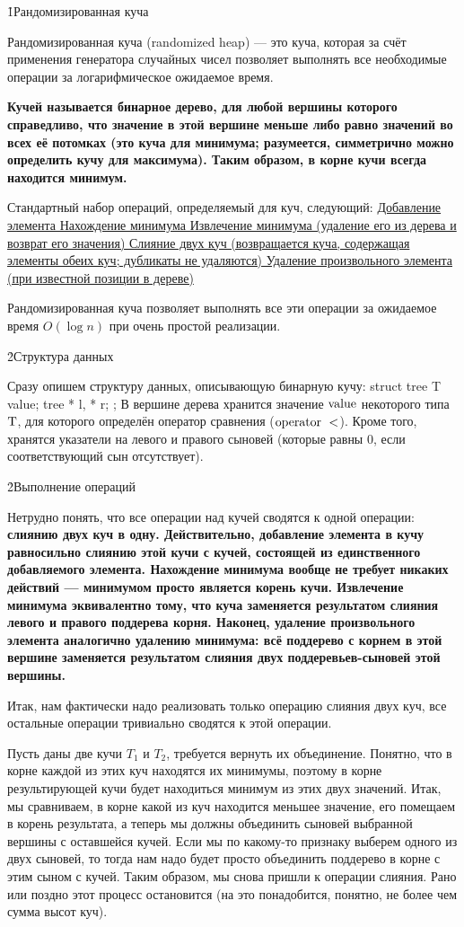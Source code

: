 \h1{Рандомизированная куча}

Рандомизированная куча (randomized heap) --- это куча, которая за счёт применения генератора случайных чисел позволяет выполнять все необходимые операции за логарифмическое ожидаемое время.

\bf{Кучей} называется бинарное дерево, для любой вершины которого справедливо, что значение в этой вершине меньше либо равно значений во всех её потомках (это куча для минимума; разумеется, симметрично можно определить кучу для максимума). Таким образом, в корне кучи всегда находится минимум.

Стандартный набор операций, определяемый для куч, следующий:
\ul{
\li Добавление элемента
\li Нахождение минимума
\li Извлечение минимума (удаление его из дерева и возврат его значения)
\li Слияние двух куч (возвращается куча, содержащая элементы обеих куч; дубликаты не удаляются)
\li Удаление произвольного элемента (при известной позиции в дереве)
}

Рандомизированная куча позволяет выполнять все эти операции за ожидаемое время $O(\log n)$ при очень простой реализации.

\h2{Структура данных}

Сразу опишем структуру данных, описывающую бинарную кучу:
\code
struct tree {
	T value;
	tree * l, * r;
};
\endcode
В вершине дерева хранится значение $\rm value$ некоторого типа $\rm T$, для которого определён оператор сравнения ($\rm operator\ <$). Кроме того, хранятся указатели на левого и правого сыновей (которые равны 0, если соответствующий сын отсутствует).

\h2{Выполнение операций}

Нетрудно понять, что все операции над кучей сводятся к одной операции: \bf{слиянию} двух куч в одну. Действительно, добавление элемента в кучу равносильно слиянию этой кучи с кучей, состоящей из единственного добавляемого элемента. Нахождение минимума вообще не требует никаких действий --- минимумом просто является корень кучи. Извлечение минимума эквивалентно тому, что куча заменяется результатом слияния левого и правого поддерева корня. Наконец, удаление произвольного элемента аналогично удалению минимума: всё поддерево с корнем в этой вершине заменяется результатом слияния двух поддеревьев-сыновей этой вершины.

Итак, нам фактически надо реализовать только операцию слияния двух куч, все остальные операции тривиально сводятся к этой операции.

Пусть даны две кучи $T_1$ и $T_2$, требуется вернуть их объединение. Понятно, что в корне каждой из этих куч находятся их минимумы, поэтому в корне результирующей кучи будет находиться минимум из этих двух значений. Итак, мы сравниваем, в корне какой из куч находится меньшее значение, его помещаем в корень результата, а теперь мы должны объединить сыновей выбранной вершины с оставшейся кучей. Если мы по какому-то признаку выберем одного из двух сыновей, то тогда нам надо будет просто объединить поддерево в корне с этим сыном с кучей. Таким образом, мы снова пришли к операции слияния. Рано или поздно этот процесс остановится (на это понадобится, понятно, не более чем сумма высот куч).

